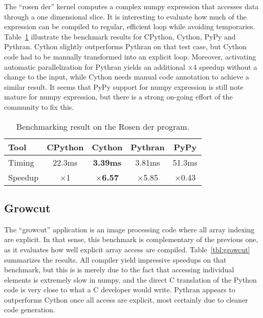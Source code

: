 \documentclass[10pt, onecolumn, preprint]{sigplanconf}
\begin{document}
The ``rosen der'' kernel computes a complex numpy expression that accesses
data through a one dimensional slice. It is interesting to evaluate how much of
the expression can be compiled to regular, efficient loop while avoiding
temporaries.  Table~\ref{tbl:rosen} illustrate the benchmark results for
CPython, Cython, PyPy and Pythran. Cython slightly outperforms Pythran on that
test case, but Cython code had to be manually transformed into an explicit
loop. Moreover, activating automatic parallelization for Pythran yields an
additional $\times4$ speedup without a change to the input, while Cython needs
manual code annotation to achieve a similar result. It seems that PyPy support
for numpy expression is still note mature for numpy expression, but there is a
strong on-going effort of the community to fix this.

\begin{table}
    \centering

    \begin{tabular}{|l|c|c|c|c|}
        \hline
     Tool    &  CPython    &   Cython     &     Pythran   &  PyPy \\
    \hline
    Timing  &  22.3ms   &   \textbf{3.39ms}     &    3.81ms &  51.3ms  \\
    \hline
    Speedup &  $\times$1         &    \textbf{$\times$6.57}      &    $\times$5.85   &  $\times$0.43    \\
    \hline
\end{tabular}
\caption{Benchmarking result on the Rosen der program.}
\label{tbl:rosen}

\end{table}

\subsection{Growcut}

The ``growcut'' application is an image processing code where all array indexing
are explicit. In that sense, this benchmark is complementary of the previous
one, as it evaluates how well explicit array access are compiled.
Table~\ref{tbl:growcut} summarizes the results. All compiler yield impressive
speedups on that benchmark, but this is is merely due to the fact that
accessing individual elements is extremely slow in numpy, and the direct C
translation of the Python code is very close to what a C developer would write.
Pythran appears to outperforms Cython once all access are explicit, most
certainly due to cleaner code generation.
\end{document}
